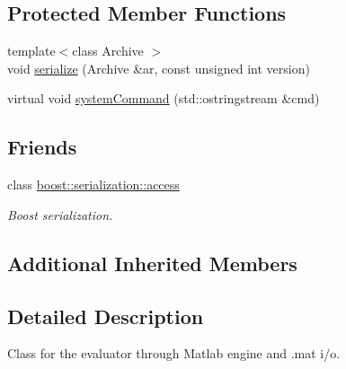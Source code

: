 \subsection*{Protected Member Functions}
\begin{DoxyCompactItemize}
\item 
{\footnotesize template$<$class Archive $>$ }\\void \hyperlink{class_go_s_u_m_1_1_c_matlab_shell_evaluator_af84e659441da0694bff64c2d955831b9}{serialize} (Archive \&ar, const unsigned int version)
\item 
virtual void \hyperlink{class_go_s_u_m_1_1_c_matlab_shell_evaluator_ab365048eef74e7b837fcb4420f763f1f}{system\-Command} (std\-::ostringstream \&cmd)
\end{DoxyCompactItemize}
\subsection*{Friends}
\begin{DoxyCompactItemize}
\item 
class \hyperlink{class_go_s_u_m_1_1_c_matlab_shell_evaluator_ac98d07dd8f7b70e16ccb9a01abf56b9c}{boost\-::serialization\-::access}
\begin{DoxyCompactList}\small\item\em Boost serialization. \end{DoxyCompactList}\end{DoxyCompactItemize}
\subsection*{Additional Inherited Members}


\subsection{Detailed Description}
Class for the evaluator through Matlab engine and .mat i/o. 


